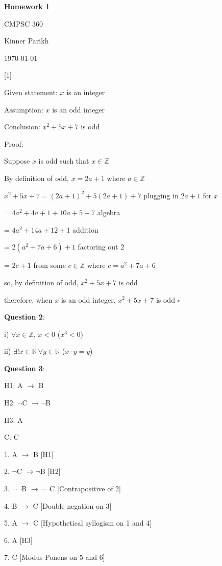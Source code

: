 \documentclass{article} %
\newcommand{\question}[2][]{\begin{flushleft}
        \textbf{Question #1}: \textit{#2}

\end{flushleft}}
\newcommand{\maketitletwo}[2][]{\begin{center}
        \Large{\textbf{Homework #1}
            
            CMPSC 360} %
        \vspace{5pt}
        
        \normalsize{Kinner Parikh  %
        
        \today}        %
        \vspace{15pt}
        
\end{center}}
\begin{document}
    \maketitletwo[1]  %
    
    \question[1]{}

    Given statement: $x$ is an integer

    Assumption: $x$ is an odd integer

    Conclusion: $x^2 + 5x + 7$ is odd

    \hspace*{0.3cm}

    Proof:

    Suppose $x$ is odd such that $x \in \mathbb{Z}$

    By definition of odd, $x = 2a + 1$ where $a \in \mathbb{Z}$

    $x^2 + 5x + 7 = (2a + 1)^2 +5(2a + 1) + 7$ \tabto*{8cm} plugging in $2a + 1$ for $x$
    
    \hspace*{1.76cm} = $4a^2 + 4a + 1 + 10a + 5 + 7$ \tabto*{8cm} algebra

    \hspace*{1.76cm} = $4a^2 + 14a + 12 + 1$ \tabto*{8cm} addition

    \hspace*{1.76cm} = $2(a^2 + 7a + 6) + 1$ \tabto*{8cm} factoring out 2

    \hspace*{1.76cm} = $2c + 1$ from some $c \in \mathbb{Z}$ where $c = a^2 + 7a + 6$

    so, by definition of odd, $x^2 + 5x + 7$ is odd

    therefore, when $x$ is an odd integer, $x^2 + 5x + 7$ is odd $\square$

    \question[2]{}


    i) $\forall x \in \mathbb{Z}$, $x < 0$ ($x^3 < 0$)

    ii) $\exists ! x \in \mathbb{R}\ \forall y \in \mathbb{R}$ ($x \cdot y = y$)

    \question[3]{}

    H1: A $\rightarrow$ B

    H2: $\neg$C $\rightarrow \neg$B

    H3: A

    C: C

    \hspace*{0.3cm}

    1. A $\rightarrow$ B \tabto*{4cm}[H1]

    2. $\neg$C $\rightarrow \neg$B \tabto*{4cm}[H2]

    3. $\neg \neg$B $\rightarrow \neg \neg$C \tabto*{4cm}[Contrapositive of 2]

    4. B $\rightarrow$ C \tabto*{4cm}[Double negation on 3]

    5. A $\rightarrow$ C \tabto*{4cm}[Hypothetical syllogism on 1 and 4]

    6. A \tabto*{4cm}[H3]

    7. C \tabto*{4cm}[Modus Ponens on 5 and 6]


    
\end{document}
